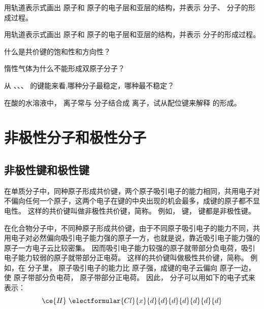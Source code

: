 \begin{Practice}[习题]
\begin{question}
  \item 用轨道表示式画出  原子和  原子的电子层和亚层的结构，并表示  分子、 分子的形成过程。
  \item 用轨道表示式画出  原子和  原子的电子层和亚层的结构，并表示  分子的形成过程。
  \item 什么是共价键的饱和性和方向性？
  \item 惰性气体为什么不能形成双原子分子？
  \item 从 、、、 的键能来看,哪种分子最稳定，哪种最不稳定？
  \item 在酸的水溶液中， 离子常与  分子结合成  离子，试从配位键来解释  的形成。
\end{question}
\end{Practice}

\section{非极性分子和极性分子}
\subsection{非极性键和极性键}
在单质分子中，同种原子形成共价键，两个原子吸引电子的能力相同，共用电子对不偏向任何一个原子，这两个电子在键的中央出现的机会最多，成键的原子都不显电性。
这样的共价键叫做非极性共价键，简称。
例如， 键， 键都是非极性键。

在化合物分子中，不同种原子形成共价键，由于不同原子吸引电子的能力不同，共用电子对必然偏向吸引电子能力强的原子一方，也就是说，靠近吸引电子能力强的原子一方电子云比较密集。
因而吸引电子能力较强的原子就带部分负电荷，吸引电子能力较弱的原子就带部分正电荷。
这样的共价键叫做极性共价键，简称。
例如，在  分子里， 原子吸引电子的能力比  原子强，成键的电子云偏向  原子一边，使  原子带部分负电荷， 原子带部分正电荷。
因此， 分子可以用如下的电子式来表示：
\[\ce{H}\:\:\!\electformular{Cl}{x}{d}{d}{d}{d}{d}{d}{d}\]
